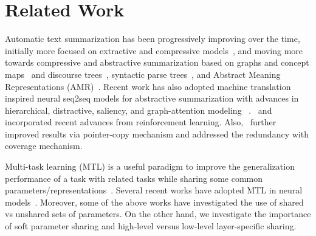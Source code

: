 \documentclass[11pt,a4paper]{article}
\begin{document}
 



\section{Related Work}
\label{Related Work}

Automatic text summarization has been progressively improving over the time, initially more focused on extractive and compressive models~\cite{jing2000sentence,knight2002summarization,clarke2008global,filippova2015sentence,kedzie2015predicting}, and moving more towards compressive and abstractive summarization based on graphs and concept maps~\cite{giannakopoulos2009automatic,ganesan2010opinosis,falke2017bringing} and discourse trees~\cite{gerani2014abstractive}, syntactic parse trees~\cite{cheung2014unsupervised,wang2016sentence}, and Abstract Meaning Representations (AMR)~\cite{liu2015toward,dohare2017text}.  
Recent work has also adopted machine translation inspired neural seq2seq models for abstractive summarization with advances in hierarchical, distractive, saliency, and graph-attention modeling ~\cite{rush2015neural,chopra2016abstractive,nallapati2016abstractive,Chen2016DistractionBasedNN,Tan2017AbstractiveDS}.~ and~ incorporated recent advances from reinforcement learning. Also,~ further improved results via pointer-copy mechanism and addressed the redundancy with coverage mechanism.
 

Multi-task learning (MTL) is a useful paradigm to improve the generalization performance of a task with related tasks while sharing some common parameters/representations~\cite{caruana1998multitask,argyriou2007multi,kumar2012learning}. 
Several recent works have adopted MTL in neural models~\cite{luong2015multi,Misra2016CrossStitchNF,Hashimoto2017AJM,pasunuru2017multitask,Ruder2017SluiceNL,Kaiser2017OneMT}. 
Moreover, some of the above works have investigated the use of shared vs unshared sets of parameters. On the other hand, we investigate the importance of soft parameter sharing and high-level versus low-level layer-specific sharing.
\end{document}
